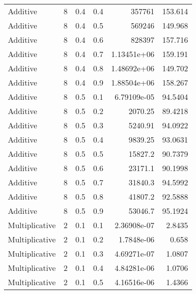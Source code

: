 \documentclass{article}
\begin{document}
\begin{longtable}[H]{lrrrrr}
 Additive       &       8 &   0.4 &            0.4 & 357761           &        153.614  \\
 Additive       &       8 &   0.4 &            0.5 & 569246           &        149.968  \\
 Additive       &       8 &   0.4 &            0.6 & 828397           &        157.716  \\
 Additive       &       8 &   0.4 &            0.7 &      1.13451e+06 &        159.191  \\
 Additive       &       8 &   0.4 &            0.8 &      1.48692e+06 &        149.702  \\
 Additive       &       8 &   0.4 &            0.9 &      1.88504e+06 &        158.267  \\
 Additive       &       8 &   0.5 &            0.1 &      6.79109e-05 &         94.5404 \\
 Additive       &       8 &   0.5 &            0.2 &   2070.25        &         89.4218 \\
 Additive       &       8 &   0.5 &            0.3 &   5240.91        &         94.0922 \\
 Additive       &       8 &   0.5 &            0.4 &   9839.25        &         93.0631 \\
 Additive       &       8 &   0.5 &            0.5 &  15827.2         &         90.7379 \\
 Additive       &       8 &   0.5 &            0.6 &  23171.1         &         90.1998 \\
 Additive       &       8 &   0.5 &            0.7 &  31840.3         &         94.5992 \\
 Additive       &       8 &   0.5 &            0.8 &  41807.2         &         92.5888 \\
 Additive       &       8 &   0.5 &            0.9 &  53046.7         &         95.1924 \\
 Multiplicative &       2 &   0.1 &            0.1 &      2.36908e-07 &          2.8435 \\
 Multiplicative &       2 &   0.1 &            0.2 &      1.7848e-06  &          0.658  \\
 Multiplicative &       2 &   0.1 &            0.3 &      4.69271e-07 &          1.0807 \\
 Multiplicative &       2 &   0.1 &            0.4 &      4.84281e-06 &          1.0706 \\
 Multiplicative &       2 &   0.1 &            0.5 &      4.16516e-06 &          1.4366 \\

\end{longtable}
\end{document}
